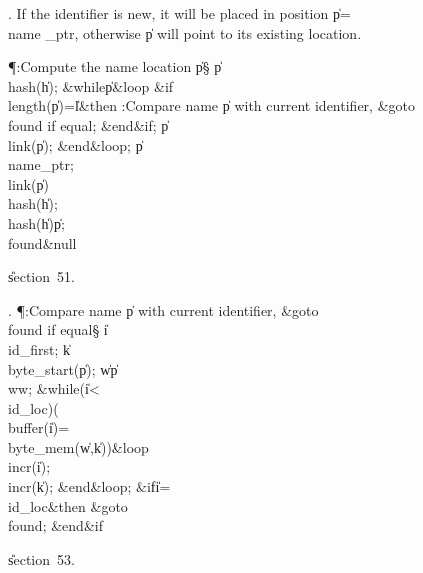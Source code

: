 . If the identifier is new, it will be placed in position \|p\?=\?\\{name%
\_ptr},
otherwise \|p will point to its existing location.

\Y\P\?\4:Compute the name location \|p\X\S\?\6
\|p\?\K\?\\{hash}\?\1(\?\|h\?\2)\?;\6
\1\&{while}\8\|p\?\I{}\8\&{loop}\6
\&{if}\1\1\8\\{length}\?\1(\?\|p\?\2)=\?\|l\2\8\&{then}\6
:Compare name \|p with current identifier, \&{goto}\8\\{found} if equal\X;%
\2\6
\&{end}\8\2\&{if}\1;\6
\|p\?\K\?\\{link}\?\1(\?\|p\?\2)\?;\2\6
\&{end}\8\&{loop};\6
\|p\?\K\?\\{name\_ptr};\6
\\{link}\?\1(\?\|p\?\2)\K\?\\{hash}\?\1(\?\|h\?\2)\?;\5
\\{hash}\?\1(\?\|h\?\2)\K\?\|p;\6
\4\BL\\{found}\EL\8\&{null}\par
\U section~51.\fi

. \P\?:Compare name \|p with current identifier, \&{goto}\8\\{found} if
equal\X\S\?\6
\|i\?\K\?\\{id\_first};\5
\|k\?\K\?\\{byte\_start}\?\1(\?\|p\?\2)\?;\5
\|w\?\K\?\|p\?\?\\{ww};\6
\1\&{while}\?\8\1(\?\|i\?<\?\\{id\_loc}\?\2)\W\1(\?\\{buffer}\?\1(\?\|i\?\2)=\?%
\\{byte\_mem}\?\1(\?\|w\?,\?\|k\?\2)\2)\?\8\&{loop}\6
\\{incr}\?\1(\?\|i\?\2)\?;\5
\\{incr}\?\1(\?\|k\?\2)\?;\2\6
\&{end}\8\&{loop};\6
\&{if}\1\1\8\|i\?=\?\\{id\_loc}\2\8\&{then}\6
\&{goto}\8\\{found};\2\6
\&{end}\8\2\&{if}\1\par
\U section~53.\fi


